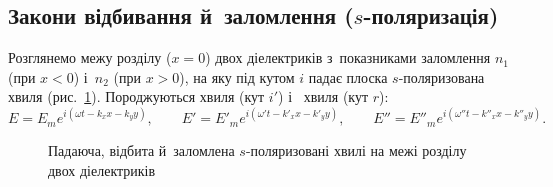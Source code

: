 \subsection*{Закони відбивання й~заломлення ($s$-поляризація)}

Розглянемо межу розділу ($x=0$) двох діелектриків з~показниками заломлення $n_1$ (при $x<0$) і~$n_2$ (при $x>0$), на яку під кутом $i$ падає
плоска $s$-поляризована хвиля (рис.~\ref{pic:SPolarization}). Породжуються  хвиля (кут $i'$) і~ хвиля (кут $r$):
\begin{equation*}
	E = E_m e^{i(\omega t - k_xx-k_yy)}, \qquad E' = E'_m e^{i(\omega' t-k'_xx-k'_yy)}, \qquad E'' = E''_m e^{i(\omega''t-k''_xx-k''_yy)}.
\end{equation*}

\begin{figure}\centering
	\caption{Падаюча, відбита й~заломлена $s$-поляризовані хвилі на межі розділу двох
		діелектриків\label{pic:SPolarization}}
\end{figure}

